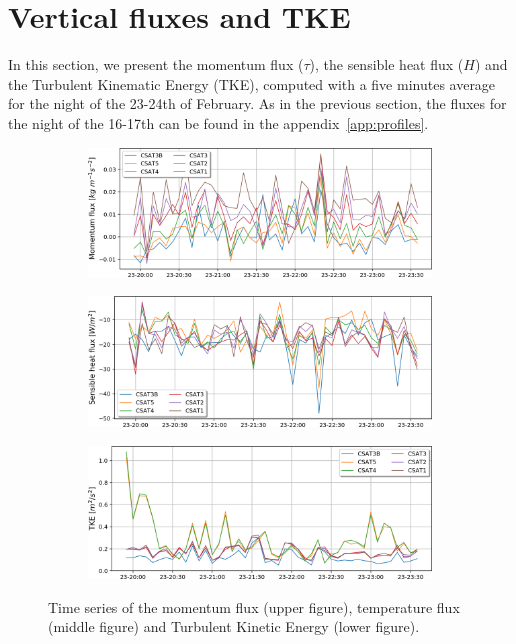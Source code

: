 \section{Vertical fluxes and TKE}

In this section, we present the momentum flux ($\tau$), the sensible heat flux ($H$) and the Turbulent Kinematic Energy (TKE), computed with a five minutes average for the night of the 23-24th of February. As in the previous section, the fluxes for the night of the 16-17th can be found in the appendix~\ref{app:profiles}.

\begin{figure}[!ht]
    \centering
    \begin{subfigure}[b]{0.58\textwidth}
        \includegraphics[width=\textwidth]{fig/chapter_4/23-24/Tau_23-24.png}
      \label{fig:Tau_23-24}
    \end{subfigure}
    \begin{subfigure}[b]{0.58\textwidth}
        \includegraphics[width=\textwidth]{fig/chapter_4/23-24/H23-24.png}
        \label{fig:H_23-24}
    \end{subfigure}
    \begin{subfigure}[b]{0.58\textwidth}
        \includegraphics[width=\textwidth]{fig/chapter_4/23-24/TKE23-24.png}
        \label{fig:TKE_23-24}
    \end{subfigure}
    \caption{Time series of the momentum flux (upper figure), temperature flux (middle figure) and Turbulent Kinetic Energy (lower figure). }
    \label{fig:23-24_flux_series}
\end{figure}

